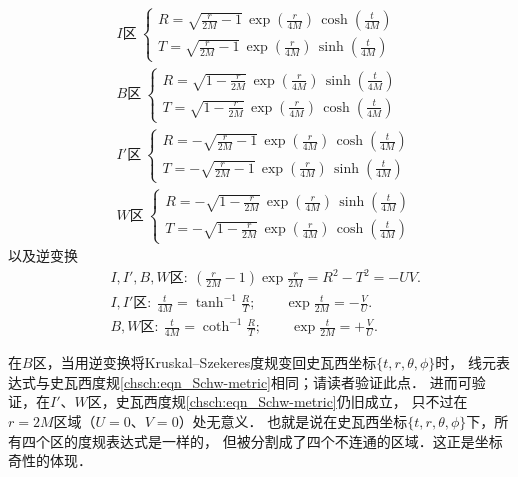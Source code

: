 \begin{align}
    &I\text{区}\ 
    \begin{cases}
       R = \sqrt{\frac{r}{2M}-1}\, \exp\left(\frac{r}{4M}\right)\, \cosh\left(\frac{t}{4M}\right) \\
       T = \sqrt{\frac{r}{2M}-1}\, \exp\left(\frac{r}{4M}\right)\, \sinh\left(\frac{t}{4M}\right) 
    \end{cases} \label{chsch:eqn_SK-I} \\
    &    B\text{区}\ 
    \begin{cases}
         R = \sqrt{1-\frac{r}{2M}}\,\exp\left(\frac{r}{4M}\right)\,\sinh\left(\frac{t}{4M}\right) \\
         T = \sqrt{1-\frac{r}{2M}}\,\exp\left(\frac{r}{4M}\right)\,\cosh\left(\frac{t}{4M}\right) 
    \end{cases} \label{chsch:eqn_SK-B} \\
    & I'\text{区}\ 
    \begin{cases}
       R = -\sqrt{\frac{r}{2M}-1}\,\exp\left(\frac{r}{4M}\right)\,\cosh\left(\frac{t}{4M}\right) \\
       T = -\sqrt{\frac{r}{2M}-1}\,\exp\left(\frac{r}{4M}\right)\,\sinh\left(\frac{t}{4M}\right) 
    \end{cases} \label{chsch:eqn_SK-Ip} \\
    &W\text{区}\ 
    \begin{cases}
       R = -\sqrt{1-\frac{r}{2M}}\,\exp\left(\frac{r}{4M}\right)\,\sinh\left(\frac{t}{4M}\right) \\
       T = -\sqrt{1-\frac{r}{2M}}\,\exp\left(\frac{r}{4M}\right)\,\cosh\left(\frac{t}{4M}\right) 
    \end{cases} \label{chsch:eqn_SK-W} 
\end{align}
以及逆变换
\begin{align}
&I,I',B,W \text{区}:\    \left(\frac{r}{2M}-1\right) \exp{\frac{r}{2M}} = R^2-T^2= -U V  .  \label{chsch:eqn_tr-TR}  \\
&I,I' \text{区}:\       \frac{t}{4M} = \tanh^{-1} \frac{R}{T};\qquad \exp\frac{t}{2M}= -\frac{V}{U} . \label{chsch:eqn_tr-VU-IIp} \\
&B,W \text{区}:\        \frac{t}{4M} = \coth^{-1} \frac{R}{T};\qquad \exp\frac{t}{2M}= +\frac{V}{U} . \label{chsch:eqn_tr-VU-BW}
\end{align}

在$B$区，当用逆变换将Kruskal--Szekeres度规变回史瓦西坐标$\{t,r,\theta,\phi\}$时，
线元表达式与史瓦西度规\eqref{chsch:eqn_Schw-metric}相同；请读者验证此点．
进而可验证，在$I'$、$W$区，史瓦西度规\eqref{chsch:eqn_Schw-metric}仍旧成立，
只不过在$r=2M$区域（$U=0$、$V=0$）处无意义．
也就是说在史瓦西坐标$\{t,r,\theta,\phi\}$下，所有四个区的度规表达式是一样的，
但被分割成了四个不连通的区域．这正是坐标奇性的体现．


